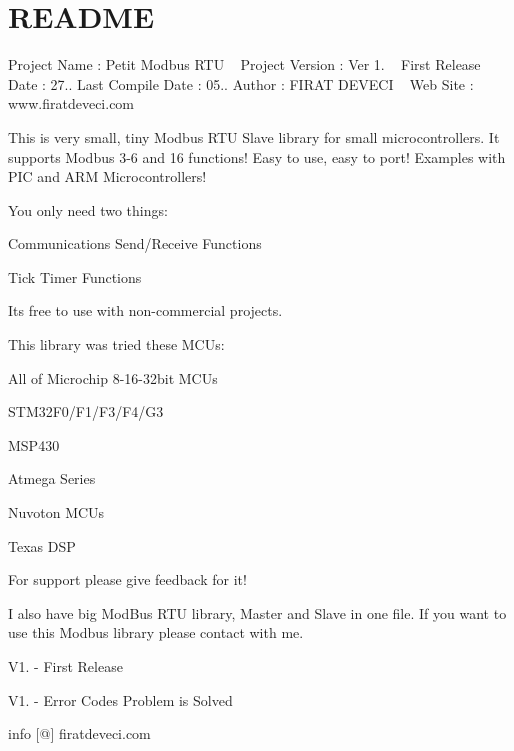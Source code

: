 \chapter{README}
\hypertarget{md__petit_modbus_2_r_e_a_d_m_e}{}\label{md__petit_modbus_2_r_e_a_d_m_e}
Project Name \+: Petit Modbus RTU ~\newline
 Project Version \+: Ver 1. ~\newline
 First Release Date \+: 27.. Last Compile Date \+: 05.. Author \+: FIRAT DEVECI ~\newline
 Web Site \+: www.\+firatdeveci.\+com ~\newline


This is very small, tiny Modbus RTU Slave library for small microcontrollers. It supports Modbus 3-\/6 and 16 functions! Easy to use, easy to port! Examples with PIC and ARM Microcontrollers!

You only need two things\+:
\begin{DoxyItemize}
\item Communications Send/\+Receive Functions
\item Tick Timer Functions
\end{DoxyItemize}

It\textquotesingle{}s free to use with non-\/commercial projects. ~\newline


This library was tried these MCUs\+:
\begin{DoxyItemize}
\item All of Microchip 8-\/16-\/32bit MCUs
\item STM32\+F0/\+F1/\+F3/\+F4/\+G3
\item MSP430
\item Atmega Series
\item Nuvoton MCUs
\item Texas DSP
\end{DoxyItemize}

For support please give feedback for it!

I also have big Mod\+Bus RTU library, Master and Slave in one file. If you want to use this Modbus library please contact with me.

V1. -\/ First Release

V1. -\/ Error Codes Problem is Solved

info \mbox{[}@\mbox{]} firatdeveci.\+com 